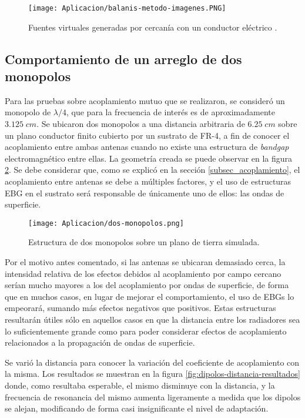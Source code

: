 \begin{figure}[h]
	\centering
	\texttt{[image: Aplicacion/balanis-metodo-imagenes.PNG]}
	\caption{Fuentes virtuales generadas por cercanía con un conductor eléctrico \cite{Balanis:Theory}.}
	\label{fig:fuentes-virtuales}
\end{figure}

\subsection{Comportamiento de un arreglo de dos monopolos}

Para las pruebas sobre acoplamiento mutuo que se realizaron, se consideró un monopolo de $\lambda/4$, que para la frecuencia de interés es de aproximadamente $3.125\;cm$. Se ubicaron dos monopolos a una distancia arbitraria de $6.25\; cm$ sobre un plano conductor finito cubierto por un sustrato de FR-4, a fin de conocer el acoplamiento entre ambas antenas cuando no existe una estructura de \textit{bandgap} electromagnético entre ellas. La geometría creada se puede observar en la figura \ref{fig:dos-monopolos}. Se debe considerar que, como se explicó en la sección \ref{subsec_acoplamiento}, el acoplamiento entre antenas se debe a múltiples factores, y el uso de estructuras EBG en el sustrato será responsable de únicamente uno de ellos: las ondas de superficie.

\begin{figure}[h]
	\centering
	\texttt{[image: Aplicacion/dos-monopolos.png]}
	\caption{Estructura de dos monopolos sobre un plano de tierra simulada.}
	\label{fig:dos-monopolos}
\end{figure}

Por el motivo antes comentado, si las antenas se ubicaran demasiado cerca, la intensidad relativa de los efectos debidos al acoplamiento por campo cercano serían mucho mayores a los del acoplamiento por ondas de superficie, de forma que en muchos casos, en lugar de mejorar el comportamiento, el uso de EBGs lo empeorará, sumando más efectos negativos que positivos. Estas estructuras resultarán útiles sólo en aquellos casos en que la distancia entre los radiadores sea lo suficientemente grande como para poder considerar efectos de acoplamiento relacionados a la propagación de ondas de superficie.

Se varió la distancia para conocer la variación del coeficiente de acoplamiento con la misma. Los resultados se muestran en la figura \ref{fig:dipolos-distancia-resultados} donde, como resultaba esperable, el mismo disminuye con la distancia, y la frecuencia de resonancia del mismo aumenta ligeramente a medida que los dipolos se alejan, modificando de forma casi insignificante el nivel de adaptación.

